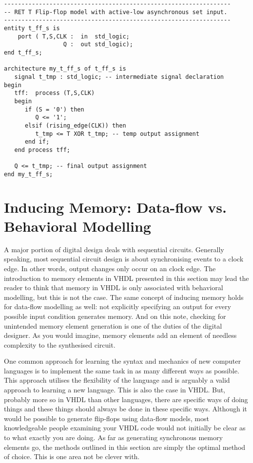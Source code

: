 \begin{lstlisting}[label=exe_17, caption=Solution to example 17.]
-----------------------------------------------------------------
-- RET T Flip-flop model with active-low asynchronous set input.
-----------------------------------------------------------------
entity t_ff_s is 
    port ( T,S,CLK :  in  std_logic; 
                 Q :  out std_logic); 
end t_ff_s;

architecture my_t_ff_s of t_ff_s is 
   signal t_tmp : std_logic; -- intermediate signal declaration 
begin
   tff:  process (T,S,CLK)
   begin
      if (S = '0') then  
         Q <= '1'; 
      elsif (rising_edge(CLK)) then 
         t_tmp <= T XOR t_tmp; -- temp output assignment
      end if; 
   end process tff; 

   Q <= t_tmp; -- final output assignment
end my_t_ff_s; 
\end{lstlisting}    

\section{Inducing Memory: Data-flow vs. Behavioral Modelling}
A major portion of digital design deals with sequential circuits. Generally speaking, most sequential circuit design is about synchronising events to a clock edge. In other words, output changes only occur on an clock edge. The introduction to memory elements in VHDL presented in this section may lead the reader to think that memory in VHDL is only associated with behavioral modelling, but this is not the case. The same concept of inducing memory holds for data-flow modelling as well: not explicitly specifying an output for every possible input condition generates memory. And on this note, checking for unintended memory element generation is one of the duties of the digital designer. As you would imagine, memory elements add an element of needless complexity to the synthesised circuit.

One common approach for learning the syntax and mechanics of new computer languages is to implement the same task in as many different ways as possible. This approach utilises the flexibility of the language and is arguably a valid approach to learning a new language. This is also the case in VHDL. But, probably more so in VHDL than other languages, there are specific ways of doing things and these things should always be done in these specific ways. Although it would be possible to generate flip-flops using data-flow models, most knowledgeable people examining your VHDL code would not initially be clear as to what exactly you are doing. As far as generating synchronous memory elements go, the methods outlined in this section are simply the optimal method of choice. This is one area not be clever with. 

